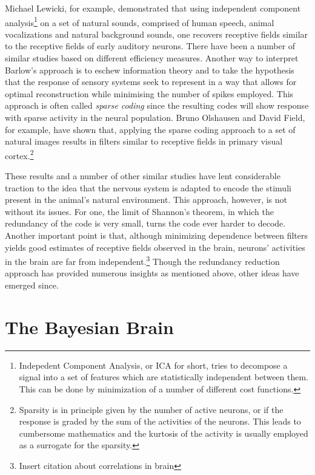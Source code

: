 Michael Lewicki, for example, demonstrated that using independent component analysis\footnote{Indepedent Component Analysis, or ICA for short, tries to 
decompose a signal into a set of features which are statistically independent between them. This can be done by minimization of a number of different cost 
functions.} on a set of natural sounds, comprised of human speech, animal vocalizations and natural background sounds, one recovers receptive fields similar to 
the receptive fields of early auditory neurons.\cite{Lewicki2002} There have been a number of similar studies based on different efficiency measures. 
Another way to interpret Barlow's approach is to eschew information theory and to take the hypothesis that the response of sensory systems seek to represent
in a way that allows for optimal reconstruction while minimising the number of spikes employed. This approach is often called \emph{sparse coding} since the
resulting codes will show response with sparse activity in the neural population. Bruno Olshausen and David Field,\cite{Olshausen1996} for example, have shown 
that, applying the sparse coding approach to a set of natural images results in filters similar to receptive fields in primary visual cortex.\footnote{Sparsity is in 
principle given by the number of active neurons, or if the response is graded by the sum of the activities of the neurons. This leads to cumbersome mathematics
and the kurtosis of the activity is usually employed as a surrogate for the sparsity.}\par

These results and a number of other similar studies have lent considerable traction to the idea that the nervous system is adapted to encode the stimuli present in 
the animal's natural environment. This approach, however, is not without its issues. For one, the limit of Shannon's theorem, in which the redundancy of the code is 
very small, turns the code ever harder to decode. Another important point is that, although minimizing dependence between filters yields good estimates of 
receptive fields observed in the brain, neurons' activities in the brain are far from independent.\footnote{Insert citation about correlations in brain} Though the 
redundancy reduction approach has provided numerous insights as mentioned above, other ideas have emerged since.
\par

\section{The Bayesian Brain}

